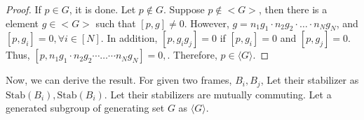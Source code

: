 \documentclass[a4paper,12pt]{article}
\begin{document}
\begin{proof}

If $p \in G$, it is done. Let $p \notin G$.
Suppose $p \notin <G>$, then there is a element $g\in <G>$ such that
$[p, g] \neq 0$. However, $g = n_1 g_1 \cdot n_2 g_2 \cdot \dots \cdot n_N g_N$, and 
$[p, g_i] = 0, \forall i \in [N]$.
In addition, $[p, g_i g_j] =0$ if $[p, g_i] =0$ and $[p, g_j]=0$.
Thus, $[p, n_1 g_1 \cdot n_2 g_2 \cdots \dots \cdots n_N g_N] =0, \!$.
Therefore, $p \in \langle G \rangle$.

\end{proof}

Now, we can derive the result. For given two frames, $B_i, B_j$, 
Let their stabilizer as $\mbox{Stab}(B_i), \mbox{Stab}(B_i)$.
Let their stabilizers are mutually commuting.
Let a generated subgroup of generating set $G$ as $\langle G \rangle$.
\end{document}
